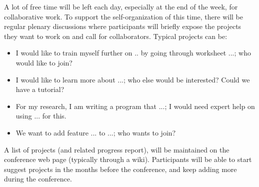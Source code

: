\documentclass[12pt]{amsbook}
\begin{document}
A lot of free time will be left each day, especially at the end of the
week, for collaborative work. To support the self-organization of this
time, there will be regular plenary discussions where participants
will briefly expose the projects they want to work on and call for
collaborators. Typical projects can be:
\begin{itemize}
\item I would like to train myself further on .. by going through
  worksheet ...; who would like to join?
\item I would like to learn more about ...; who else would be
  interested? Could we have a tutorial?
\item For my research, I am writing a program that ...; I would need
  expert help on using ... for this.
\item We want to add feature ... to ...; who wants to join?
\end{itemize}

A list of projects (and related progress report), will be maintained
on the conference web page (typically through a wiki). Participants
will be able to start suggest projects in the months before the
conference, and keep adding more during the conference.
\end{document}

